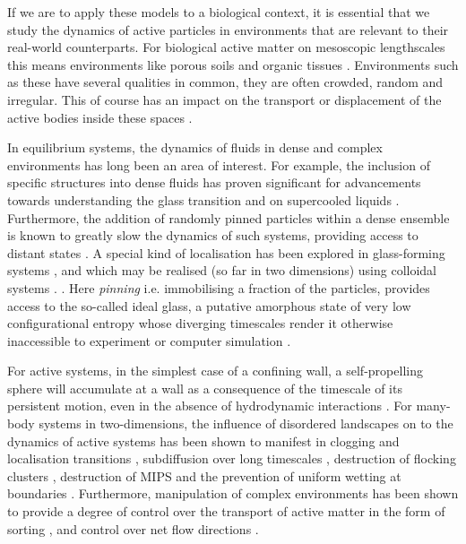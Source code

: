 If we are to apply these models to a biological context, it is essential that we study the dynamics of active particles in environments that are relevant to their real-world counterparts. For biological active matter on mesoscopic lengthscales this means environments like porous soils \cite{gannon1991} and organic tissues \cite{isermann2017}. Environments such as these have several qualities in common, they are often crowded, random and irregular. This of course has an impact on the transport or displacement of the active bodies inside these spaces \cite{bechinger2016a}. 

In equilibrium systems, the dynamics of fluids in dense and complex environments has long been an area of interest. For example, the inclusion of specific structures into dense fluids has proven significant for advancements towards understanding the glass transition and on supercooled liquids \cite{alcoutlabi2005,kim2011}. Furthermore, the addition of randomly pinned particles within a dense ensemble is known to greatly slow the dynamics of such systems, providing access to distant states \cite{russo2010,karmakar2013,kim2011,ozawa2015}. A special kind of localisation has been explored in glass-forming systems \cite{biroli2008}, and which may be realised (so far in two dimensions) using colloidal systems \cite{gokhale2016,gokhale2014a,williams2018}.
. Here \textit{pinning} i.e. immobilising a fraction of the particles, provides access to the so-called ideal glass, a putative amorphous state of very low configurational entropy whose diverging timescales render it otherwise inaccessible to experiment or computer simulation \cite{berthier2011}.

For active systems, in the simplest case of a confining wall, a self-propelling sphere will accumulate at a wall as a consequence of the timescale of its persistent motion, even in the absence of hydrodynamic interactions \cite{elgeti2013}. For many-body systems in two-dimensions, the influence of disordered landscapes on to the dynamics of active systems has been shown to manifest in clogging and localisation transitions \cite{reichhardt2017,reichhardt2018,chepizhko2019a}, subdiffusion over long timescales \cite{chepizhko2013,zeitz2017,morin2017}, destruction of flocking clusters \cite{morin2017}, destruction of MIPS and the prevention of uniform wetting at boundaries \cite{dor2021}.
 Furthermore, manipulation of complex environments has been shown to provide a degree of control over the transport of active matter in the form of sorting \cite{volpe2011a}, and control over net flow directions \cite{borba2020}.


